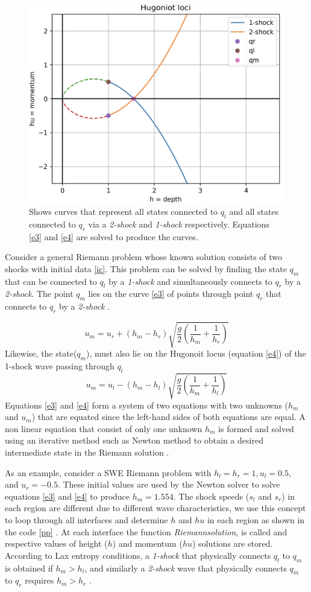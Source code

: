 \documentclass[11pt,a4paper]{article}
\begin{document}
	\begin{figure}[H]
		\centering
		\includegraphics[width=0.5\linewidth]{images/hl}
		\caption{Shows curves that represent all states connected to $q_l$ and all states connected to $q_r$ via a {\em 2-shock} and {\em 1-shock} respectively.  Equations \eqref{e3} and \eqref{e4} are solved to produce the curves.}
		\label{fig:hl}
	\end{figure}
	
	Consider a general Riemann problem whose known solution consists of two shocks with initial data \eqref{ic}. This problem can be solved by finding the state $q_m$ that can be connected to $q_l$ by a {\em 1-shock} and simultaneously connects to $q_r$ by a {\em 2-shock}. The point $q_m$ lies on the  curve \eqref{e3} of points  through  point $q_r$  that connects to $q_r$ by a {\em 2-shock}  \cite{be-ge-le-ma:2011}.
	
	\begin{equation}
		u_{m} = u_{r} + (h_{m} - h_{r})\sqrt{\frac{g}{2}\left(\frac{1}{h_m} + \frac{1}{h_r} \right)}
		\label{e3}
	\end{equation}
	Likewise, the state($q_m$), must also lie on the Hugonoit locus (equation \eqref{e4}) of the 1-shock wave passing through $q_l$
	\begin{equation}
		u_{m} = u_{l} - (h_{m} - h_{l})\sqrt{\frac{g}{2}\left(\frac{1}{h_m} + \frac{1}{h_l} \right)}
		\label{e4}
	\end{equation}
	Equations \eqref{e3} and \eqref{e4} form a system of two equations with two unknowns ($h_m$ and $u_m$) that are equated since the left-hand sides of both equations are equal. A non linear equation that consist of only one unknown $h_m$ is formed and solved using an iterative method such as Newton method to obtain a desired intermediate state in the Riemann solution \cite{le-ge-be:2011}.
	
	As an example, consider a SWE Riemann problem with $h_l = h_r = 1, u_l = 0.5, $ and $u_r = -0.5$. These initial values are used by the Newton solver to solve equations \eqref{e3} and \eqref{e4} to produce $h_{m} = 1.554$. The shock speeds ($s_l$ and $s_r$) in each region are different due to different wave characteristics, we use this concept to loop through all interfaces and determine $h$ and $hu$ in each region as shown in the code \ref{pp} . At each interface the function {\em Riemann\textunderscore solution}, is called and respective values of   height ($h$) and momentum  ($hu$) solutions are stored. According to Lax entropy conditions, a  {\em 1-shock} that physically connects $q_l$ to $q_m$ is obtained if $h_m>h_l$, and similarly a {\em 2-shock} wave that physically connects $q_m$ to $q_r$ requires $h_m>h_r$  \cite{le-ge-be:2011}.
	
\end{document}
